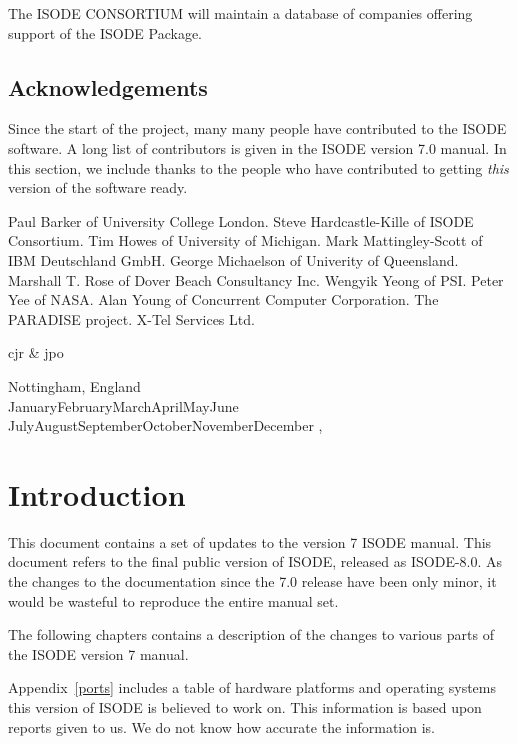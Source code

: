 The ISODE CONSORTIUM will maintain a database of companies
offering support of the ISODE Package.

\newpage\section*{Acknowledgements}

Since the start of the project, many many people have contributed to
the ISODE software.  A long list of contributors is given in the ISODE
version 7.0 manual.  In this section, we include thanks to the people
who have contributed to getting {\em this} version of the software ready.

Paul Barker of University College London.
Steve Hardcastle-Kille of ISODE Consortium.
Tim Howes of University of Michigan.
Mark Mattingley-Scott of IBM Deutschland GmbH.
George Michaelson of Univerity of Queensland.
Marshall T. Rose of Dover Beach Consultancy Inc.
Wengyik Yeong of PSI.
Peter Yee of NASA.
Alan Young of Concurrent Computer Corporation. 
The PARADISE project.
X-Tel Services Ltd.

\vspace{0.25in}
{\raggedleft cjr \& jpo \par}
{\raggedright Nottingham, England\\
\ifcase\month
    \number\month\or
    January\or February\or March\or April\or May\or June\or
    July\or August\or September\or October\or November\or December\else
\number\month\fi,
{\oldstyle\number\year}\par}

\newpage
\ifodd\value{page} \else
    \mbox{}
    \newpage
\fi
{}

\chapter{Introduction}

This document contains a set of updates to the version 7 ISODE manual.
This document refers to the final public version of ISODE, released as
ISODE-8.0.  As the changes to the documentation since the 7.0 release
have been only minor, it would be wasteful to reproduce the entire
manual set.

The following chapters contains a description of the changes to
various parts of the ISODE version 7 manual.

Appendix~\ref{ports} includes a table of hardware platforms and
operating systems this version of ISODE is believed to work on.  This
information is based upon reports given to us.  We do not know how
accurate the information is.

